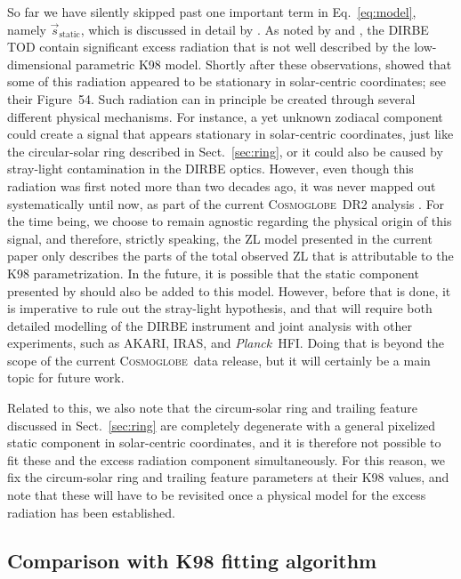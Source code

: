 \documentclass[twocolumn]{aa}
\def\Planck{\textit{Planck}}
\newcommand{\s}[0]{\vec{s}}
\newcommand{\cosmoglobe}{\textsc{Cosmoglobe}}
\begin{document}
So far we have silently skipped past one important term in
Eq.~\eqref{eq:model}, namely $\s_{\mathrm{static}}$, which is
discussed in detail by \citep{CG02_01}.  As noted by
\citet{hauser1998} and \citet{Kelsall1998}, the DIRBE TOD contain
significant excess radiation that is not well described by the
low-dimensional parametric K98 model. Shortly after these
observations, \citet{leinert:1998} showed that some of this radiation
appeared to be stationary in solar-centric coordinates; see their
Figure~54. Such radiation can in principle be created through several
different physical mechanisms. For instance, a yet unknown zodiacal
component could create a signal that appears stationary in
solar-centric coordinates, just like the circular-solar ring described
in Sect.~\ref{sec:ring}, or it could also be caused by stray-light
contamination in the DIRBE optics. However, even though this radiation
was first noted more than two decades ago, it was never mapped out
systematically until now, as part of the current \cosmoglobe\ DR2
analysis \citep{CG02_01}. For the time being, we choose to remain
agnostic regarding the physical origin of this signal, and therefore,
strictly speaking, the ZL model presented in the current paper only
describes the parts of the total observed ZL that is attributable to
the K98 parametrization. In the future, it is possible that the static
component presented by \citet{CG02_01} should also be added to this
model. However, before that is done, it is imperative to rule out the
stray-light hypothesis, and that will require both detailed modelling
of the DIRBE instrument and joint analysis with other experiments,
such as AKARI, IRAS, and \Planck\ HFI. Doing that is beyond the scope
of the current \cosmoglobe\ data release, but it will certainly be a
main topic for future work.

Related to this, we also note that the circum-solar ring and trailing
feature discussed in Sect.~\ref{sec:ring} are completely degenerate
with a general pixelized static component in solar-centric
coordinates, and it is therefore not possible to fit these and the
excess radiation component simultaneously. For this reason, we fix the
circum-solar ring and trailing feature parameters at their K98 values,
and note that these will have to be revisited once a physical model
for the excess radiation has been established.


\subsection{Comparison with K98 fitting algorithm}
\label{sec:algorithm_comparison}
\end{document}
